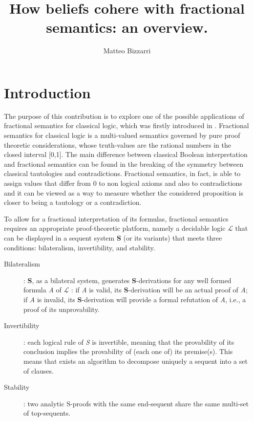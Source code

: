 \documentclass[a4paper, 12pt, oneside]{article}
\title {
	How beliefs cohere with fractional semantics: an overview. 
}
\author {
	\normalsize Matteo Bizzarri\\\normalsize
}
\theoremstyle{plain}
\theoremstyle{definition}
\newcommand{\Li}{$\mathcal{L}$ }
\begin{document}
 \maketitle


\section{Introduction}

The purpose of this contribution is to explore one of the possible applications of  fractional semantics for classical logic, which was firstly introduced in \cite{piazzapulcini:fractional}.	Fractional semantics for classical logic is a multi-valued semantics governed by pure proof theoretic considerations, whose truth-values are the rational numbers in the closed interval [0,1]. The main difference between  classical Boolean interpretation and fractional semantics can be found in the breaking of the symmetry between classical tautologies and contradictions. Fractional semantics, in fact, is able to assign values that differ from 0 to non logical axioms and also to contradictions and it can be viewed as a way to measure whether the considered proposition is closer to being a tautology or a contradiction. 

To allow for a fractional interpretation of its formulas, fractional semantics requires an appropriate proof-theoretic platform, namely a decidable logic \Li that can be displayed in a sequent system \textbf{S} (or its variants) that meets three conditions: bilateralism, invertibility, and stability.


	\begin{description}
	\item[Bilateralism]: \textbf{S}, as a bilateral system, generates \textbf{S}-derivations for any well formed formula \textit{A} of \Li : if \textit{A} is valid, its \textbf{S}-derivation will be an actual proof of \textit{A}; if \textit{A} is invalid, its \textbf{S}-derivation will provide a formal refutation of \textit{A}, i.e., a proof of its unprovability.
 
	\item[Invertibility]: each logical rule of \textit{S} is invertible, meaning that the provability of its conclusion implies the provability of (each one of) its premise(s). This means that exists an algorithm to decompose uniquely a sequent into a set of clauses.

	\item[Stability]:  two analytic S-proofs with the same end-sequent share the same multi-set of top-sequents. 
\end{description}
\end{document}
